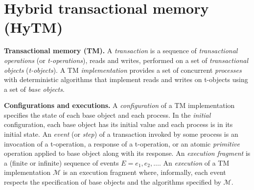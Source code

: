 \section{Hybrid transactional memory (HyTM)}
\label{sec:hytm}

\textbf{Transactional memory (TM).} 
A \emph{transaction} is a sequence of \emph{transactional operations}
(or \emph{t-operations}), reads and writes, performed on a set of \emph{transactional objects} 
(\emph{t-objects}). 
A TM \emph{implementation} provides a set of
concurrent \emph{processes} with deterministic algorithms that implement reads and
writes on t-objects using  a set of \emph{base objects}.

\textbf{Configurations and executions.} 
A \emph{configuration} of a TM implementation specifies the state of each base object and each process. 
In the \emph{initial} configuration, each base object has its initial value and each process is in its initial state. 
An \emph{event} (or \emph{step}) of a transaction invoked by some process is an invocation of a t-operation, 
a response of a t-operation, or an atomic \emph{primitive} operation applied to base object along with its response. 
An \emph{execution fragment} is a (finite or infinite) sequence of events $E = e_1,e_2,\dots$. 
An \emph{execution} of a TM implementation $\mathcal{M}$ is an
execution fragment where, informally, each event respects the
specification of base objects and the algorithms specified by $\mathcal{M}$.

